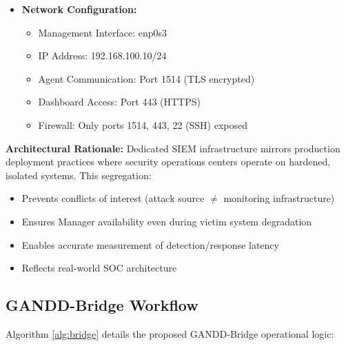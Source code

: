 \begin{itemize}
    \item \textbf{Network Configuration:}
    \begin{itemize}
        \item Management Interface: enp0s3
        \item IP Address: 192.168.100.10/24
        \item Agent Communication: Port 1514 (TLS encrypted)
        \item Dashboard Access: Port 443 (HTTPS)
        \item Firewall: Only ports 1514, 443, 22 (SSH) exposed
    \end{itemize}
\end{itemize}

\textbf{Architectural Rationale:} Dedicated SIEM infrastructure mirrors production deployment practices where security operations centers operate on hardened, isolated systems. This segregation:
\begin{itemize}
    \item Prevents conflicts of interest (attack source $\neq$ monitoring infrastructure)
    \item Ensures Manager availability even during victim system degradation
    \item Enables accurate measurement of detection/response latency
    \item Reflects real-world SOC architecture
\end{itemize}

\subsection{GANDD-Bridge Workflow}

Algorithm \ref{alg:bridge} details the proposed GANDD-Bridge operational logic:

